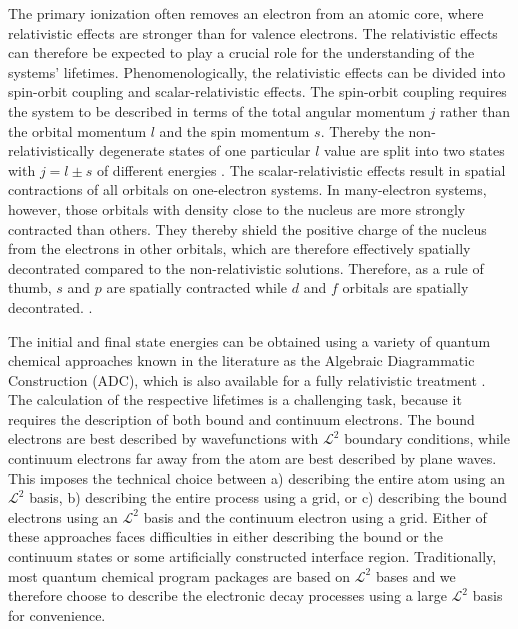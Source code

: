 The primary ionization often removes an electron from an atomic core, where
relativistic effects are stronger than for valence electrons. The relativistic
effects can therefore be expected to play a crucial role for the understanding
of the systems' lifetimes.
Phenomenologically, the relativistic effects can be divided  
into spin-orbit coupling and scalar-relativistic effects. The spin-orbit       
coupling requires the system to be described in terms of the total angular     
momentum $j$ rather than the orbital momentum $l$ and the spin momentum $s$.   
Thereby the non-relativistically degenerate states of one particular $l$       
value are split into two states with $j=l\pm s$ of different energies          
\cite{ReiherWolf09}.                                            
The scalar-relativistic effects result in spatial contractions of all orbitals on
one-electron systems. In many-electron systems, however, those orbitals with density close
to the nucleus are more strongly contracted than others. They thereby
shield the positive charge of the nucleus from the electrons in other orbitals,
which are therefore effectively spatially decontrated compared to the non-relativistic
solutions. Therefore, as a rule of thumb, $s$ and $p$ are spatially contracted while
$d$ and $f$ orbitals are spatially decontrated. \cite{ReiherWolf09}.

The initial and final state energies can be obtained using      
a variety of quantum chemical approaches known in the literature as the       
Algebraic Diagrammatic Construction \cite{Schirmer82_1,Schirmer91,Schirmer98, 
Mertins96_1} (ADC), which is also                               
available for a fully relativistic treatment                    
\cite{Pernpointner04_1,Pernpointner04_2,Pernpointner10_1}.
The calculation of the respective lifetimes is a challenging task, because it
requires the description of both bound and continuum electrons. The bound electrons
are best described by wavefunctions with $\mathcal{L}^2$ boundary conditions,
while continuum electrons far away from the atom are best described by
plane waves. This imposes the technical choice between a) describing the entire
atom using an $\mathcal{L}^2$ basis, b) describing the entire process using
a grid, or c) describing the bound electrons using an $\mathcal{L}^2$ basis
and the continuum electron using a grid.
Either     
of these approaches faces difficulties in either describing the bound or the  
continuum states or some artificially constructed interface region.
Traditionally, most quantum
chemical program packages are based on $\mathcal{L}^2$ bases and we therefore
choose to describe the electronic decay processes using a large $\mathcal{L}^2$
basis for convenience.

